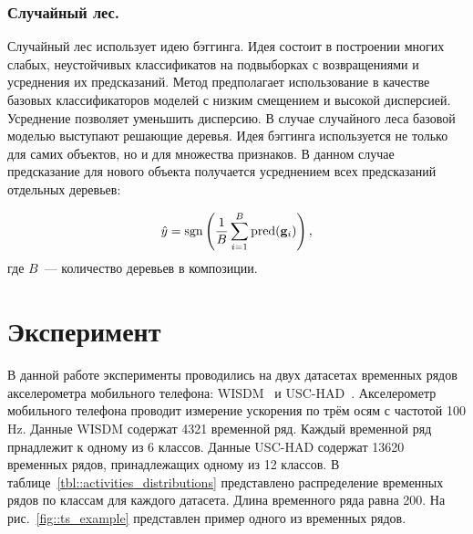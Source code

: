 \subsubsection{Случайный лес.}
Случайный лес использует идею бэггинга. 
Идея состоит в построении многих слабых, неустойчивых классификатов на подвыборках с возвращениями и усреднения их предсказаний.
Метод предполагает использование в качестве базовых классификаторов моделей с низким смещением и высокой дисперсией. 
Усреднение позволяет уменьшить дисперсию.
В случае случайного леса базовой моделью выступают решающие деревья. Идея бэггинга используется не только для самих объектов, но и для множества признаков.
В данном случае предсказание для нового объекта получается усреднением всех предсказаний отдельных деревьев:

\begin{equation*}
\hat{y} = \operatorname{\mathop{sgn}} \left(\frac{1}{B} \sum_{i=1}^{B} \text{pred}(\mathbf{g}_i) \right),
\end{equation*}
где $B$~--- количество деревьев в композиции.


\section{Эксперимент}
В данной работе эксперименты проводились на двух датасетах временных рядов акселерометра мобильного телефона: WISDM~\cite{wisdm} и USC-HAD~\cite{usc}. 
Акселерометр мобильного телефона проводит измерение ускорения по трём осям с частотой 100 Hz.
Данные WISDM содержат 4321 временной ряд.
Каждый временной ряд прнадлежит к одному из 6 классов. 
Данные USC-HAD содержат 13620 временных рядов, принадлежащих одному из 12 классов.  
В таблице~\ref{tbl::activities_distributions} представлено распределение временных рядов по классам для каждого датасета.
Длина временного ряда равна 200.
На рис.~\ref{fig::ts_example} представлен пример одного из временных рядов.

